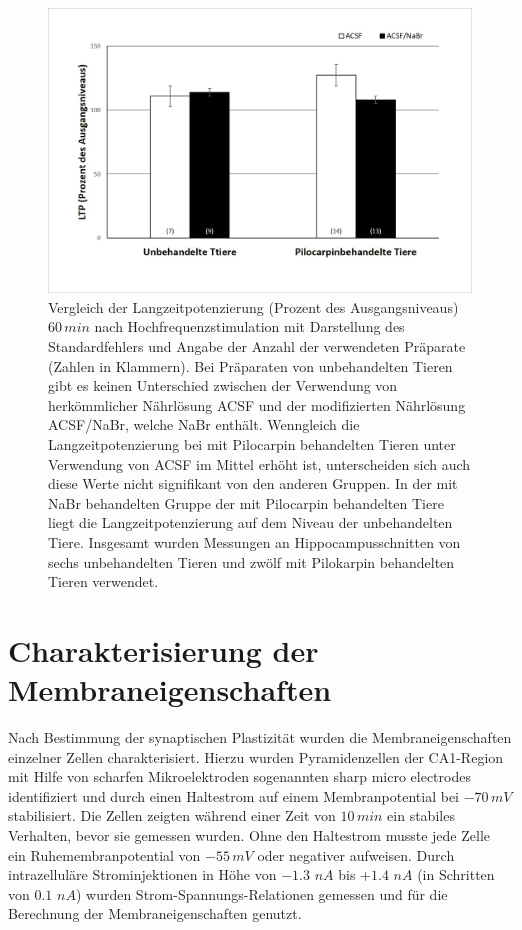 \documentclass[a4paper,11pt]{report}
\begin{document}
{\begin{figure}[H]
\begin{center}
\includegraphics[width=13cm]{Abbildungen/feld_samples/ltp_diagramm.jpg}
\caption{Vergleich der Langzeitpotenzierung (Prozent des Ausgangsniveaus) $60\,min$ nach Hochfrequenzstimulation mit Darstellung des Standardfehlers und Angabe der Anzahl der verwendeten Präparate (Zahlen in Klammern). Bei Präparaten von unbehandelten Tieren gibt es keinen Unterschied zwischen der Verwendung von herkömmlicher Nährlösung ACSF und der modifizierten Nährlösung ACSF/NaBr, welche NaBr enthält. Wenngleich die Langzeitpotenzierung bei mit Pilocarpin behandelten Tieren unter Verwendung von ACSF im Mittel erhöht ist, unterscheiden sich auch diese Werte nicht signifikant von den anderen Gruppen. In der mit NaBr behandelten Gruppe der mit Pilocarpin behandelten Tiere liegt die Langzeitpotenzierung auf dem Niveau der unbehandelten Tiere. Insgesamt wurden Messungen an Hippocampusschnitten von sechs unbehandelten Tieren und zwölf mit Pilokarpin behandelten Tieren verwendet.}  
\end{center}
\end{figure}

\section{Charakterisierung der Membraneigenschaften}

Nach Bestimmung der synaptischen Plastizität wurden die Membraneigenschaften einzelner Zellen charakterisiert. Hierzu wurden Pyramidenzellen der CA1-Region mit Hilfe von scharfen Mikroelektroden sogenannten sharp micro electrodes identifiziert und durch einen Haltestrom auf einem Membranpotential bei $-70\,mV$ stabilisiert. Die Zellen zeigten während einer Zeit von $10\,min$  ein stabiles Verhalten, bevor sie gemessen wurden. Ohne den Haltestrom musste jede Zelle ein Ruhemembranpotential von $-55\,mV$ oder negativer aufweisen. Durch intrazelluläre Strominjektionen in Höhe von $-1.3$ $nA$ bis $+1.4$ $nA$ (in Schritten von $0.1$ $nA$) wurden Strom-Spannungs-Relationen gemessen und für die Berechnung der Membraneigenschaften genutzt. \\



}
\end{document}
